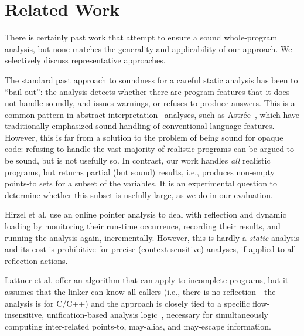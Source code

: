 
\section{Related Work}
\label{sec:related}


There is certainly past work that attempt to ensure a sound
whole-program analysis, but none matches the generality and
applicability of our approach. We selectively discuss representative
approaches.

The standard past approach to soundness for a careful static analysis
has been to ``bail out'': the analysis detects whether there are
program features that it does not handle soundly, and issues warnings,
or refuses to produce answers. This is a common pattern in
abstract-interpretation~\cite{Cousot:1977:AIU:512950.512973} analyses,
such as Astr\'{e}e~\cite{Delmas2007}, which have traditionally
emphasized sound handling of conventional language features. However,
this is far from a solution to the problem of being sound for opaque
code: refusing to handle the vast majority of realistic programs can
be argued to be sound, but is not usefully so. In contrast, our work
handles \emph{all} realistic programs, but returns partial (but sound)
results, i.e., produces non-empty points-to sets for a subset of the
variables. It is an experimental question to determine whether
this subset is usefully large, as we do in our evaluation.

Hirzel et al. \cite{ecoop/HirzelDH04,toplas/HirzelDDH07} use an
online pointer analysis to deal with reflection and dynamic loading by
monitoring their run-time occurrence, recording their results, and
running the analysis again, incrementally. However, this is hardly a
\emph{static} analysis and its cost is prohibitive for precise
(context-sensitive) analyses, if applied to all reflection
actions. 

Lattner et al. \cite{DSA:PLDI07} offer an algorithm that can apply to incomplete
programs, but it assumes that the linker can know all callers (i.e.,
there is no reflection---the analysis is for C/C++) and the approach
is closely tied to a specific flow-insensitive, unification-based
analysis logic~\cite{mattmight:Steensgard:1996:PointsTo}, necessary
for simultaneously computing inter-related points-to, may-alias, and
may-escape information.

